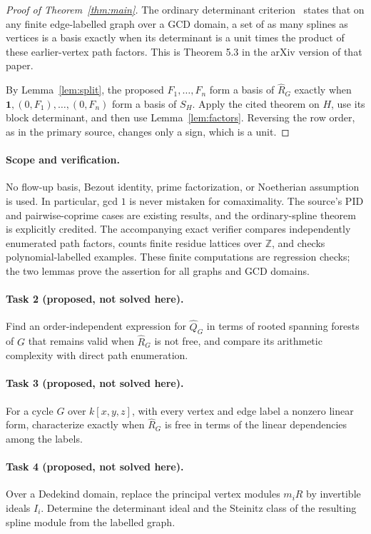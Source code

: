 \documentclass[11pt]{article}
\newcommand{\Sph}{\widehat R_G}
\begin{document}
\begin{proof}[Proof of Theorem~\ref{thm:main}]
The ordinary determinant criterion~\cite[Theorem 4.5, p.~367]{FS}
states that on any finite edge-labelled graph over a GCD domain,
a set of as many splines as vertices is a basis exactly when its
determinant is a unit times the product of these earlier-vertex path
factors. This is Theorem 5.3 in the arXiv version of that paper.

By Lemma~\ref{lem:split}, the proposed $F_1,\ldots,F_n$ form a basis of
$\Sph$ exactly when $\mathbf1,(0,F_1),\ldots,(0,F_n)$ form a basis of
$S_H$. Apply the cited theorem on $H$, use its block determinant,
and then use Lemma~\ref{lem:factors}. Reversing the row order, as in
the primary source, changes only a sign, which is a unit.
\end{proof}

\paragraph{Scope and verification.}
No flow-up basis, Bezout identity, prime factorization, or Noetherian
assumption is used. In particular, gcd $1$ is never mistaken for
comaximality. The source's PID and pairwise-coprime cases are existing
results, and the ordinary-spline theorem is explicitly credited.
The accompanying exact verifier compares independently enumerated
path factors, counts finite residue lattices over $\mathbb Z$, and
checks polynomial-labelled examples. These finite computations are
regression checks; the two lemmas prove the assertion for all graphs
and GCD domains.

\paragraph{Task 2 (proposed, not solved here).}
Find an order-independent expression for $\widehat Q_G$ in terms of
rooted spanning forests of $G$ that remains valid when $\Sph$ is not free,
and compare its arithmetic complexity with direct path enumeration.

\paragraph{Task 3 (proposed, not solved here).}
For a cycle $G$ over $k[x,y,z]$, with every vertex and edge label a
nonzero linear form, characterize exactly when $\Sph$ is free in terms
of the linear dependencies among the labels.

\paragraph{Task 4 (proposed, not solved here).}
Over a Dedekind domain, replace the principal vertex modules $m_iR$
by invertible ideals $I_i$. Determine the determinant ideal and the
Steinitz class of the resulting spline module from the labelled graph.
\end{document}
